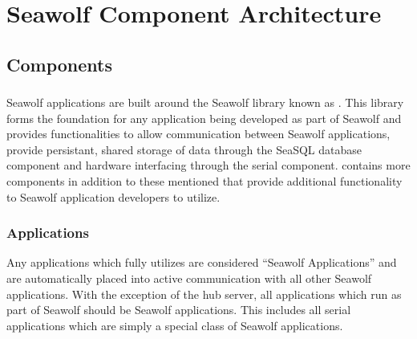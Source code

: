 
\newpage
\section{Seawolf Component Architecture} \label{architecture}
\subsection{Components} \label{archcomp}
\subsubsection{\libseawolf{}} \label{libarch}
Seawolf applications are built around the Seawolf library known as
\libseawolf{}. This library forms the foundation for any application being
developed as part of Seawolf and provides functionalities to allow communication
between Seawolf applications, provide persistant, shared storage of data through
the SeaSQL database component and hardware interfacing through the serial
component. \libseawolf{} contains more components in addition to these mentioned
that provide additional functionality to Seawolf application developers to
utilize.

\subsubsection{Applications} \label{apparch}
Any applications which fully utilizes \libseawolf{} are considered ``Seawolf
Applications'' and are automatically placed into active communication with all
other Seawolf applications. With the exception of the hub server, all
applications which run as part of Seawolf should be Seawolf applications. This
includes all serial applications which are simply a special class of Seawolf
applications.

